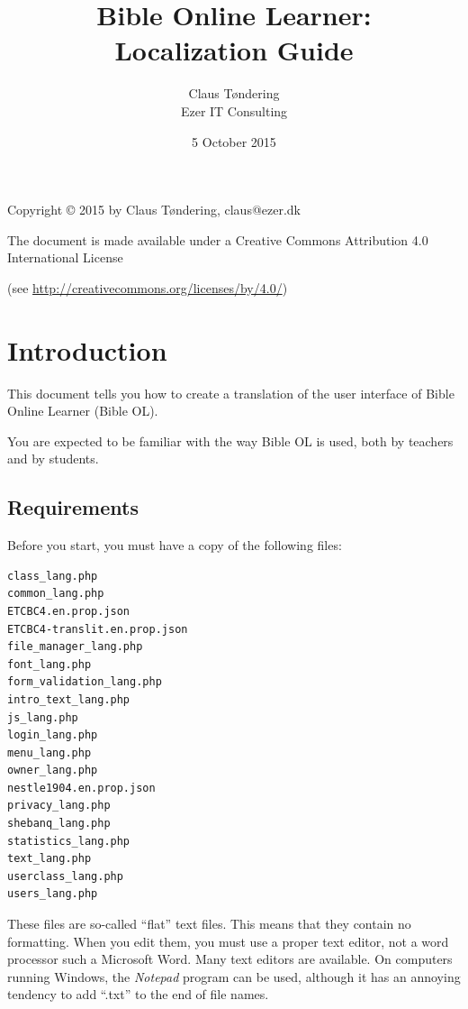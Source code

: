 \documentclass[11pt,oneside,a4paper]{memoir}
\title{Bible Online Learner:\\Localization Guide}
\author{Claus Tøndering\\Ezer IT Consulting}
\date{5 October 2015}
\begin{document}
\begin{titlingpage*}
\maketitle

\begin{center}
Copyright © 2015 by Claus Tøndering, claus@ezer.dk

\vspace{5mm}

The document is made available under a Creative Commons Attribution 4.0 International License

(see \url{http://creativecommons.org/licenses/by/4.0/})
\end{center}
\end{titlingpage*}


\clearpage
\tableofcontents
{} %

\chapter{Introduction}

This document tells you how to create a translation of the user interface of Bible Online Learner
(Bible OL).

You are expected to be familiar with the way Bible OL is used, both by teachers and by students.

\section{Requirements}

Before you start, you must have a copy of the following files:

\begin{verbatim}
class_lang.php
common_lang.php
ETCBC4.en.prop.json
ETCBC4-translit.en.prop.json
file_manager_lang.php
font_lang.php
form_validation_lang.php
intro_text_lang.php
js_lang.php
login_lang.php
menu_lang.php
owner_lang.php
nestle1904.en.prop.json
privacy_lang.php
shebanq_lang.php
statistics_lang.php
text_lang.php
userclass_lang.php
users_lang.php
\end{verbatim}

These files are so-called ``flat'' text files. This means that they contain no formatting. When you
edit them, you must use a proper text editor, not a word processor such a Microsoft Word. Many text
editors are available. On computers running Windows, the \emph{Notepad} program can be used, although
it has an annoying tendency to add ``.txt'' to the end of file names.
\end{document}
